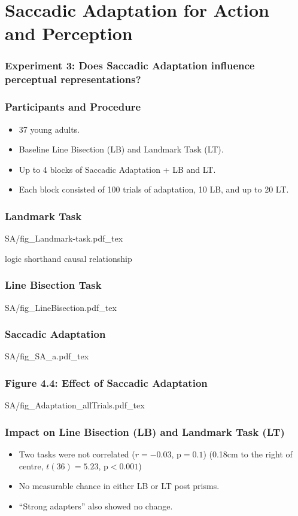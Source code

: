 \documentclass{beamer}
\begin{document}
\section[Saccadic Adaptation]{Saccadic Adaptation for Action and Perception}

\begin{frame}
	\frametitle{Experiment 3: Does Saccadic Adaptation influence perceptual representations?}
		\tableofcontents[currentsection]
\end{frame}

\begin{frame}
	\frametitle{Participants and Procedure}
	\begin{itemize}
		\item 37 young adults.
		\item Baseline Line Bisection (LB) and Landmark Task (LT).
		\item Up to 4 blocks of Saccadic Adaptation + LB and LT.
		\item Each block consisted of 100 trials of adaptation, 10 LB, and up to 20 LT.
	\end{itemize}
\end{frame}

\begin{frame}
	\frametitle{Landmark Task}
	\def\svgwidth{0.8\textwidth}
	{SA/fig_Landmark-task.pdf_tex}
\end{frame}

\begin{frame}logic shorthand causal relationship
	\frametitle{Line Bisection Task}
	\def\svgwidth{0.9\textwidth}
	{SA/fig_LineBisection.pdf_tex}
\end{frame}

\begin{frame}
	\frametitle{Saccadic Adaptation}
	\centering
	\def\svgwidth{0.7\textwidth}
	\tiny
	{SA/fig_SA_a.pdf_tex}
\end{frame}

\begin{frame}
	\frametitle{Figure 4.4: Effect of Saccadic Adaptation}
	\centering
	\def\svgwidth{0.9\textwidth}
	\tiny
	{SA/fig_Adaptation_allTrials.pdf_tex}
\end{frame}

\begin{frame}
	\frametitle{Impact on Line Bisection (LB) and Landmark Task (LT)}
	\begin{itemize}
		\item Two tasks were not correlated ($r = -0.03$, $\text{p} = 0.1$)
		(0.18cm to the right of centre, $t(36) = 5.23$, $\text{p} < 0.001$)
		\item No measurable chance in either LB or LT post prisms.
		\item ``Strong adapters'' also showed no change.
	\end{itemize}

\end{frame}
\end{document}
